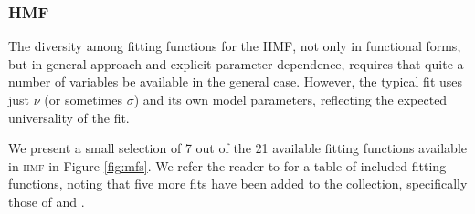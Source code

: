 \documentclass[5p,aas_macros]{elsarticle}
\begin{document}
\subsubsection{HMF}
\label{sec:halomod:components:hmf}
The diversity among fitting functions for the HMF, not only in functional forms, but in general approach and explicit parameter dependence, requires that quite a number of variables be available in the general case. However, the typical fit uses just $\nu$ (or sometimes $\sigma$) and its own model parameters, reflecting the expected universality of the fit. 

%

We present a small selection of 7 out of the 21 available fitting functions available in \textsc{hmf} in Figure \ref{fig:mfs}.
We refer the reader to \cite{Murray2013a} for a table of included fitting functions, noting that five more fits have been added to the collection, specifically those of \citet{Tinker2010,Behroozi2013a,Manera2010,Pillepich2010} and \citet{Ishiyama2015}. 
\end{document}
